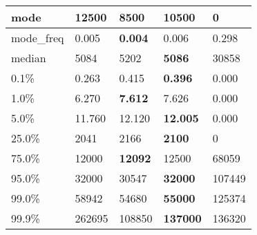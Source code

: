 \begin{table}[H]
\begin{tabular}{|l|m{10em}|m{10em}|m{10em}|m{10em}|}
\hline mode & 12500 & 8500 & \bfseries 10500 & \cellcolor[rgb]{0.9, 0.54, 0.52} 0 \\
\hline mode\_freq & 0.005 & \bfseries 0.004 & 0.006 & \cellcolor[rgb]{0.9, 0.54, 0.52} 0.298 \\
\hline median & 5084 & 5202 & \bfseries 5086 & \cellcolor[rgb]{0.9, 0.54, 0.52} 30858 \\
\hline 0.1\% & 0.263 & 0.415 & \bfseries 0.396 & \cellcolor[rgb]{0.9, 0.54, 0.52} 0.000 \\
\hline 1.0\% & 6.270 & \bfseries 7.612 & 7.626 & \cellcolor[rgb]{0.9, 0.54, 0.52} 0.000 \\
\hline 5.0\% & 11.760 & 12.120 & \bfseries 12.005 & \cellcolor[rgb]{0.9, 0.54, 0.52} 0.000 \\
\hline 25.0\% & 2041 & 2166 & \bfseries 2100 & \cellcolor[rgb]{0.9, 0.54, 0.52} 0 \\
\hline 75.0\% & 12000 & \bfseries 12092 & 12500 & \cellcolor[rgb]{0.9, 0.54, 0.52} 68059 \\
\hline 95.0\% & 32000 & 30547 & \bfseries 32000 & \cellcolor[rgb]{0.9, 0.54, 0.52} 107449 \\
\hline 99.0\% & 58942 & 54680 & \bfseries 55000 & \cellcolor[rgb]{0.9, 0.54, 0.52} 125374 \\
\hline 99.9\% & 262695 & \cellcolor[rgb]{0.9, 0.54, 0.52} 108850 & \bfseries 137000 & 136320 \\
\hline
\end{tabular}
\end{table}
